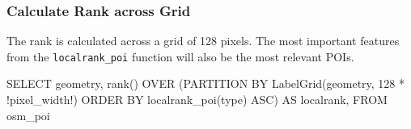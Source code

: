 \subsubsection{Calculate Rank across Grid}

The rank is calculated across a grid of 128 pixels. The most
important features from the \texttt{localrank\_poi} function will
also be the most relevant POIs.

\begin{sqlcode}
SELECT
  geometry,
  rank() OVER (PARTITION BY LabelGrid(geometry, 128 * !pixel_width!)
               ORDER BY localrank_poi(type) ASC) AS localrank,
FROM osm_poi
\end{sqlcode}


